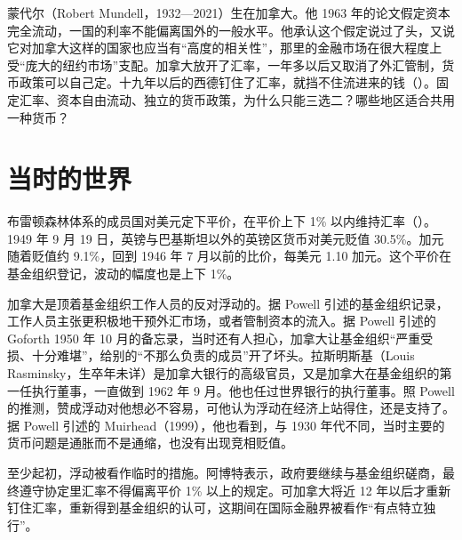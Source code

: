 蒙代尔（Robert Mundell，1932—2021）生在加拿大\cite{nobel1999,gnd37}。他 1963 年的论文假定资本完全流动，一国的利率不能偏离国外的一般水平\cite{mundell1963}。他承认这个假定说过了头，又说它对加拿大这样的国家也应当有“高度的相关性”，那里的金融市场在很大程度上受“庞大的纽约市场”支配\cite{mundell1963}。加拿大放开了汇率，一年多以后又取消了外汇管制，货币政策可以自己定。十九年以后的西德钉住了汇率，就挡不住流进来的钱（）。固定汇率、资本自由流动、独立的货币政策，为什么只能三选二？哪些地区适合共用一种货币？

\section{当时的世界}\label{sec:mundell-world}

布雷顿森林体系的成员国对美元定下平价，在平价上下 1\% 以内维持汇率（）。1949 年 9 月 19 日，英镑与巴基斯坦以外的英镑区货币对美元贬值 30.5\%\cite{powell2005}。加元随着贬值约 9.1\%，回到 1946 年 7 月以前的比价，每美元 1.10 加元\cite{powell2005}。这个平价在基金组织登记，波动的幅度也是上下 1\%\cite{powell2005}。

加拿大是顶着基金组织工作人员的反对浮动的。据 Powell 引述的基金组织记录，工作人员主张更积极地干预外汇市场，或者管制资本的流入\cite{powell2005}。据 Powell 引述的 Goforth 1950 年 10 月的备忘录，当时还有人担心，加拿大让基金组织“严重受损、十分难堪”，给别的“不那么负责的成员”开了坏头\cite{powell2005}。拉斯明斯基（Louis Rasminsky，生卒年未详）是加拿大银行的高级官员，又是加拿大在基金组织的第一任执行董事，一直做到 1962 年 9 月\cite{powell2005,loc37}。他也任过世界银行的执行董事\cite{boc1961}。照 Powell 的推测，赞成浮动对他想必不容易，可他认为浮动在经济上站得住，还是支持了\cite{powell2005}。据 Powell 引述的 Muirhead（1999），他也看到，与 1930 年代不同，当时主要的货币问题是通胀而不是通缩，也没有出现竞相贬值\cite{powell2005}。

至少起初，浮动被看作临时的措施\cite{powell2005}。阿博特表示，政府要继续与基金组织磋商，最终遵守协定里汇率不得偏离平价 1\% 以上的规定\cite{powell2005}。可加拿大将近 12 年以后才重新钉住汇率，重新得到基金组织的认可，这期间在国际金融界被看作“有点特立独行”\cite{powell2005}。

